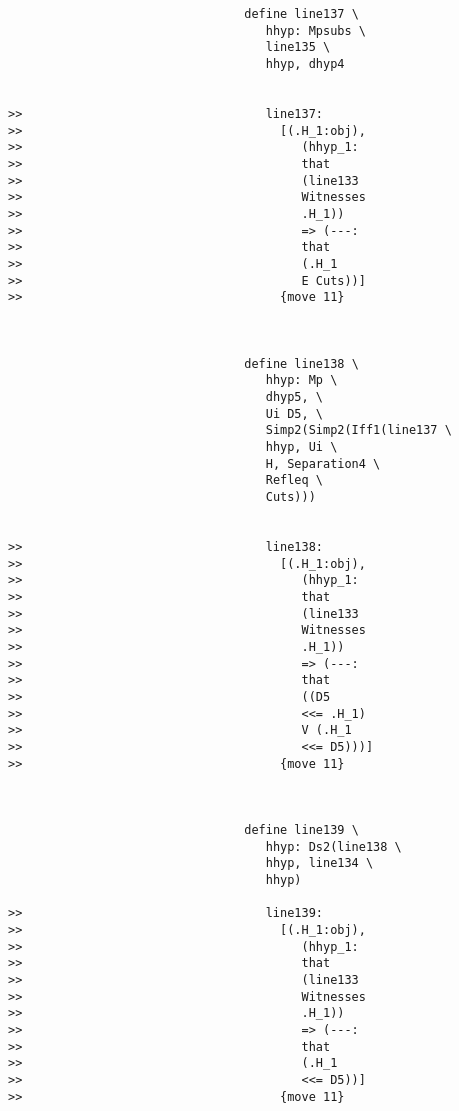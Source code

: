 \documentclass[12pt]{article}
\begin{document}
\begin{verbatim}
                                 define line137 \
                                    hhyp: Mpsubs \
                                    line135 \
                                    hhyp, dhyp4


>>                                  line137:
>>                                    [(.H_1:obj),
>>                                       (hhyp_1:
>>                                       that
>>                                       (line133
>>                                       Witnesses
>>                                       .H_1))
>>                                       => (---:
>>                                       that
>>                                       (.H_1
>>                                       E Cuts))]
>>                                    {move 11}



                                 define line138 \
                                    hhyp: Mp \
                                    dhyp5, \
                                    Ui D5, \
                                    Simp2(Simp2(Iff1(line137 \
                                    hhyp, Ui \
                                    H, Separation4 \
                                    Refleq \
                                    Cuts)))


>>                                  line138:
>>                                    [(.H_1:obj),
>>                                       (hhyp_1:
>>                                       that
>>                                       (line133
>>                                       Witnesses
>>                                       .H_1))
>>                                       => (---:
>>                                       that
>>                                       ((D5
>>                                       <<= .H_1)
>>                                       V (.H_1
>>                                       <<= D5)))]
>>                                    {move 11}



                                 define line139 \
                                    hhyp: Ds2(line138 \
                                    hhyp, line134 \
                                    hhyp)

>>                                  line139:
>>                                    [(.H_1:obj),
>>                                       (hhyp_1:
>>                                       that
>>                                       (line133
>>                                       Witnesses
>>                                       .H_1))
>>                                       => (---:
>>                                       that
>>                                       (.H_1
>>                                       <<= D5))]
>>                                    {move 11}




\end{verbatim}
\end{document}
